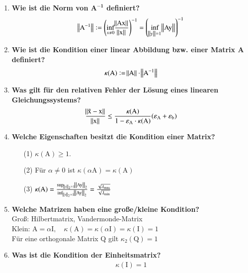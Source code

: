 \begin{enumerate}
		\item \textbf{Wie ist die Norm von \(\mathbf{A^{-1}}\) definiert?} \\
			\begin{align*}
				\norm{\text{A}^{-1}}:=\left(\underset{x\neq0}{\text{inf}}\frac{\norm{\text{Ax}}}{\norm{\text{x}}}\right)^{-1} = \left(\underset{\norm{\text{y}}=1}{\text{inf}}\norm{\text{Ay}}\right)^{-1}
			\end{align*}
		
		\item \textbf{Wie ist die Kondition einer linear Abbildung bzw. einer Matrix A definiert?}
			\begin{align*}
				\kappa(\text{A}):=\norm{\text{A}}\cdot\norm{\text{A}^{-1}}
			\end{align*}
		
		\item \textbf{Was gilt für den relativen Fehler der Lösung eines linearen Gleichungssystems?}
			\begin{align*}
				\frac{\norm{\tilde{\text{x}}-\text{x}}}{\norm{\text{x}}}\leq \frac{\kappa(\text{A})}{1-\varepsilon_\text{A}\cdot\kappa(\text{A})}(\varepsilon_\text{A}+\varepsilon_\text{b})
			\end{align*}
		
		\item \textbf{Welche Eigenschaften besitzt die Kondition einer Matrix?}
			\begin{enumerate}
				\item[(1)] \(\kappa(\text{A})\geq1\).
				\item[(2)] Für \(\alpha\neq0\) ist \(\kappa(\alpha\text{A})=\kappa(\text{A})\)
				\item[(3)] \(\kappa(\text{A})=\frac{\sup_{\norm{y}_2=1}\norm{\text{Ay}}_2}{\inf_{\norm{y}_2=1}\norm{\text{Ay}}_2}=
				\frac{\sqrt{\lambda_{\max}}}{\sqrt{\lambda_{\min}}}\)
			\end{enumerate}
		
		\item \textbf{Welche Matrizen haben eine große/kleine Kondition?} \\
			Groß: Hilbertmatrix, Vandermonde-Matrix \\
			Klein: \(\text{A}=\alpha\text{I}, \quad \kappa(\text{A})=\kappa(\alpha\text{I})=\kappa(\text{I})=1\)\\
			\mbox{}\hspace{0.88cm} Für eine orthogonale Matrix Q gilt \(\kappa_2(\text{Q})=1\)
		
		\item \textbf{Was ist die Kondition der Einheitsmatrix?}
			\begin{align*}
				\kappa(\text{I})=1
			\end{align*}
		

\end{enumerate}
